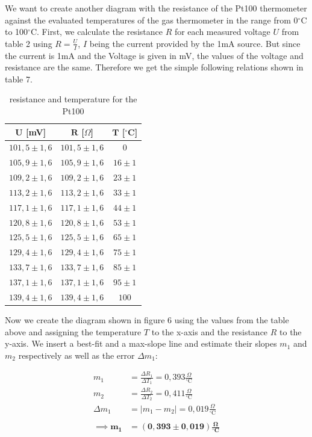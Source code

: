 \documentclass{article}
\begin{document}
We want to create another diagram with the resistance of the Pt100 thermometer against the evaluated temperatures of the gas thermometer in the range from 0$^{\circ}$C to 100$^{\circ}$C. First, we calculate the resistance $R$ for each measured voltage $U$ from table 2 using $R=\frac{U}{I}$, $I$ being the current provided by the 1mA source. But since the current is 1mA and the Voltage is given in mV, the values of the voltage and resistance are the same. Therefore we get the simple following relations shown in table 7.


\begin{table}[!ht]
    \centering
    \begin{tabular}{c|c|c}
    $\bm{U}$ [mV] & $\bm{R}$ [$\Omega$] & $\bm{T}$ [$^{\circ}$C] \\ \hline
    $101,5 \pm 1,6$  & $101,5 \pm 1,6$  & $0$ \\
    $105,9 \pm 1,6$  & $105,9 \pm 1,6$  & $16 \pm 1$ \\
    $109,2 \pm 1,6$  & $109,2 \pm 1,6$  & $23 \pm 1$ \\
    $113,2 \pm 1,6$  & $113,2 \pm 1,6$  & $33 \pm 1$ \\
    $117,1 \pm 1,6$  & $117,1 \pm 1,6$  & $44 \pm 1$ \\
    $120,8 \pm 1,6$  & $120,8 \pm 1,6$  & $53 \pm 1$ \\
    $125,5 \pm 1,6$  & $125,5 \pm 1,6$  & $65 \pm 1$ \\
    $129,4 \pm 1,6$  & $129,4 \pm 1,6$  & $75 \pm 1$ \\
    $133,7 \pm 1,6$  & $133,7 \pm 1,6$  & $85 \pm 1$ \\
    $137,1 \pm 1,6$  & $137,1 \pm 1,6$  & $95 \pm 1$ \\
    $139,4 \pm 1,6$  & $139,4 \pm 1,6$  & $100$
    \end{tabular}
    \caption{resistance and temperature for the Pt100}
\end{table}

Now we create the diagram shown in figure 6 using the values from the table above and assigning the temperature $T$ to the x-axis and the resistance $R$ to the y-axis. We insert a best-fit and a max-slope line and estimate their slopes $m_1$ and $m_2$ respectively as well as the error $\Delta m_1$:

\begin{equation}
    \begin{split}
        m_1 &= \frac{\Delta R_1}{\Delta T_1} = 0,393 \frac{\Omega}{^{\circ}\text{C}} \\
        m_2 &= \frac{\Delta R_2}{\Delta T_2} = 0,411 \frac{\Omega}{^{\circ}\text{C}} \\
        \Delta m_1 &= | m_1 - m_2 | = 0,019 \frac{\Omega}{^{\circ}\text{C}} \\ \\
        \implies \bm{m_1} &= \bm{(0,393 \pm 0,019) \frac{\Omega}{^{\circ}\textbf{C}}}
    \end{split}
\end{equation}
\end{document}
